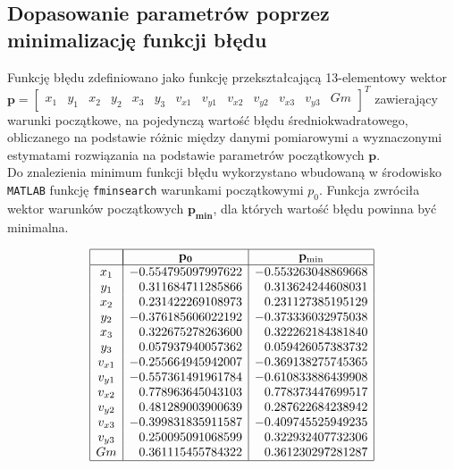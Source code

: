 \documentclass[a4paper, 12pt, twoside, openany]{article}
\begin{document}
	\subsection{Dopasowanie parametrów poprzez minimalizację funkcji błędu}
	Funkcję błędu zdefiniowano jako funkcję przekształcającą 13-elementowy wektor \\ 
	$\mathbf{p} = \left[ \begin{array}{ccccccccccccc}
		x_1 & y_1 & x_2 & y_2 & x_3 & y_3 & v_{x1} & v_{y1} & v_{x2} & v_{y2} & v_{x3} & v_{y3} & Gm 
	\end{array} \right]^T$
	zawierający warunki początkowe, na pojedynczą wartość błędu średniokwadratowego, obliczanego na podstawie różnic między danymi pomiarowymi a wyznaczonymi estymatami rozwiązania na podstawie parametrów początkowych $\mathbf{p}$.\\
	Do znalezienia minimum funkcji błędu wykorzystano wbudowaną w środowisko \texttt{MATLAB} funkcję \texttt{fminsearch} warunkami początkowymi $p_0$. Funkcja zwróciła wektor warunków początkowych $\mathbf{p_{min}}$, dla których wartość błędu powinna być minimalna. \vspace{-6pt}
	\begin{table}[H]
		\centering
		\[
		\begin{array}{|c|r|r|}
			\hline
			       & \multicolumn{1}{|c|}{\mathbf{p_0}} & \multicolumn{1}{c|}{\mathbf{p_{\text{min}}}} \\ \hline
			x_1    & -0.554795097997622                 & -0.553263048869668                           \\
			y_1    & 0.311684711285866                  & 0.313624244608031                            \\
			x_2    & 0.231422269108973                  & 0.231127385195129                            \\
			y_2    & -0.376185606022192                 & -0.373336032975038                           \\
			x_3    & 0.322675278263600                  & 0.322262184381840                            \\
			y_3    & 0.057937940057362                  & 0.059426057383732                            \\
			v_{x1} & -0.255664945942007                 & -0.369138275745365                           \\
			v_{y1} & -0.557361491961784                 & -0.610833886439908                           \\
			v_{x2} & 0.778963645043103                  & 0.778373447699517                            \\
			v_{y2} & 0.481289003900639                  & 0.287622684238942                            \\
			v_{x3} & -0.399831835911587                 & -0.409745525949235                           \\
			v_{y3} & 0.250095091068599                  & 0.322932407732306                            \\
			Gm     & 0.361115455784322                  & 0.361230297281287                            \\ \hline
		\end{array}
		\]
	\end{table}
\end{document}
